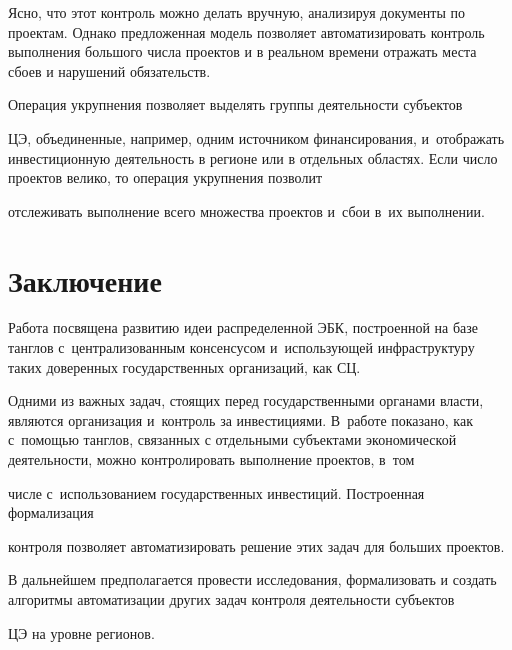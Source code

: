    


  Ясно, что этот контроль можно делать вручную, анализируя документы по проектам. Однако предложенная модель позволяет автоматизировать контроль выполнения большого числа проектов и в реальном времени отражать места сбоев и нарушений обязательств. 


  


  Операция укрупнения позволяет выделять группы деятельности субъектов 


  ЦЭ, объединенные, например, одним источником финансирования, и~отображать инвестиционную деятельность в регионе или в отдельных областях. Если число проектов велико, то операция укрупнения позволит


   отслеживать выполнение всего множества проектов и~сбои в~их выполнении.


  


  \section{Заключение}


   


  Работа посвящена развитию идеи распределенной ЭБК, построенной на базе танглов с~централизованным консенсусом и~использующей инфраструктуру таких доверенных государственных организаций, как СЦ. 


  


  Одними из важных задач, стоящих перед государственными органами влас\-ти, являются организация и~контроль за инвестициями. В~работе показано, как с~помощью танглов, связанных с отдельными субъектами экономической дея\-тель\-ности, можно контролировать выполнение проектов, в~том 


  числе с~использованием государственных инвестиций. Построенная формализация 


  контроля позволяет автоматизировать решение этих задач для больших проектов. 


  


  В дальнейшем предполагается провести исследования, формализовать и создать алгоритмы автоматизации других задач контроля деятельности субъектов 


  ЦЭ на уровне регионов.


  


